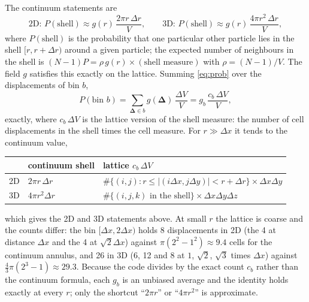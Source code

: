 \documentclass[11pt]{article}
\newcommand{\bD}{\boldsymbol{\Delta}}
\begin{document}
The continuum statements are
\begin{equation}
  \text{2D: } P(\text{shell})\approx g(r)\,\frac{2\pi r\,\Delta r}{V},\qquad
  \text{3D: } P(\text{shell})\approx g(r)\,\frac{4\pi r^2\,\Delta r}{V},
\end{equation}
where $P(\text{shell})$ is the probability that one particular other particle
lies in the shell $[r,r+\Delta r)$ around a given particle; the expected number
of neighbours in the shell is $(N-1)P=\rho\,g(r)\times(\text{shell measure})$
with $\rho=(N-1)/V$. The field $g$ satisfies this exactly on the lattice.
Summing \eqref{eq:prob} over the displacements of bin $b$,
\begin{equation}
  P(\text{bin }b) = \sum_{\bD\in b}g(\bD)\,\frac{\Delta V}{V}
  = g_b\,\frac{c_b\,\Delta V}{V},
\end{equation}
exactly, where $c_b\,\Delta V$ is the lattice version of the shell measure:
the number of cell displacements in the shell times the cell measure. For
$r\gg\Delta x$ it tends to the continuum value,
\begin{center}
\begin{tabular}{@{}l l l@{}}
\toprule
 & continuum shell & lattice $c_b\,\Delta V$ \\
\midrule
2D & $2\pi r\,\Delta r$ & $\#\{(i,j): r\le|(i\Delta x,j\Delta y)|<r+\Delta r\}\times\Delta x\Delta y$ \\
3D & $4\pi r^2\Delta r$ & $\#\{(i,j,k)\text{ in the shell}\}\times\Delta x\Delta y\Delta z$ \\
\bottomrule
\end{tabular}
\end{center}
which gives the 2D and 3D statements above. At small $r$ the lattice is coarse
and the counts differ: the bin $[\Delta x,2\Delta x)$ holds 8 displacements in
2D (the 4 at distance $\Delta x$ and the 4 at $\sqrt2\Delta x$) against
$\pi(2^2-1^2)\approx9.4$ cells for the continuum annulus, and 26 in 3D (6, 12
and 8 at $1$, $\sqrt2$, $\sqrt3$ times $\Delta x$) against
$\frac43\pi(2^3-1)\approx29.3$. Because the code divides by the exact count
$c_b$ rather than the continuum formula, each $g_b$ is an unbiased average and
the identity holds exactly at every $r$; only the shortcut ``$2\pi r$'' or
``$4\pi r^2$'' is approximate.
\end{document}

